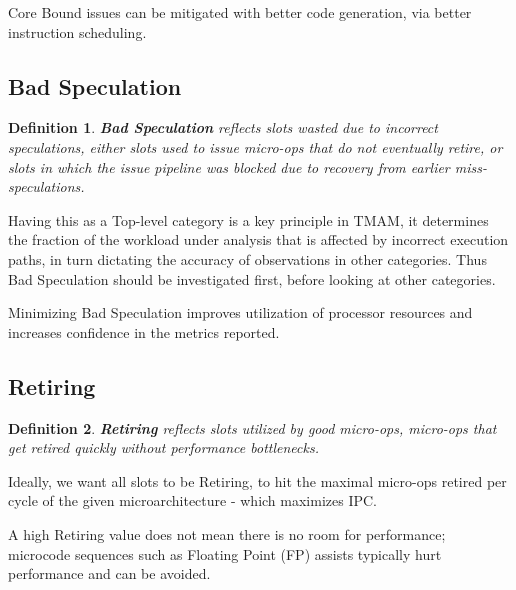\documentclass[11pt]{article}
\newtheorem{defn}{Definition}
\begin{document}
Core Bound issues can be mitigated with better code generation, via better instruction scheduling.

\subsection{Bad Speculation}
\begin{defn}
  \textbf{Bad Speculation} reflects slots wasted due to incorrect speculations, either slots used to issue micro-ops that do not eventually retire, or slots in which the issue pipeline was blocked due to recovery from earlier miss-speculations. 
\end{defn}

Having this as a Top-level category is a key principle in TMAM, it determines the fraction of the workload under analysis that is affected by incorrect execution paths, in turn dictating the accuracy of observations in other categories.
Thus Bad Speculation should be investigated first, before looking at other categories.

Minimizing Bad Speculation improves utilization of processor resources and increases confidence in the metrics reported.

\subsection{Retiring}
\begin{defn}
  \textbf{Retiring} reflects slots utilized by \textit{good micro-ops}, micro-ops that get retired quickly without performance bottlenecks.
\end{defn}
Ideally, we want all slots to be Retiring, to hit the maximal micro-ops retired per cycle of the given microarchitecture - which maximizes IPC.

A high Retiring value does not mean there is no room for performance; microcode sequences such as Floating Point (FP) assists typically hurt performance and can be avoided.
\end{document}
